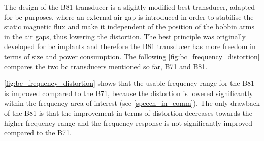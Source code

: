 
The design of the B81 transducer is a slightly modified \gls{best} transducer, adapted for \gls{bc} purposes, where an external air gap is introduced in order to stabilise the static magnetic flux and make it independent of the position of the bobbin arms in the air gaps, thus lowering the distortion.  The \gls{best} principle was originally developed for \gls{bc} implants and therefore the B81 transducer has more freedom in terms of size and power consumption. The following \autoref{fig:bc_frequency_distortion} compares the two \gls{bc} transducers mentioned so far, B71 and B81.






\autoref{fig:bc_frequency_distortion} shows that the usable frequency range for the B81 is improved compared to the B71, because the distortion is lowered significantly within the frequency area of interest (see \autoref{speech_in_comm}). The only drawback of the B81 is that the improvement in terms of distortion decreases towards the higher frequency range and the frequency response is not significantly improved compared to the B71. 


